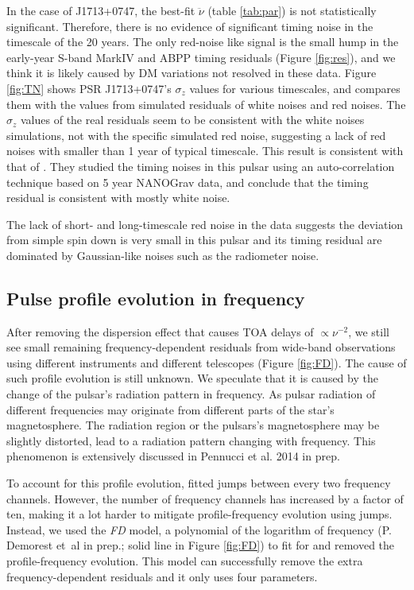 In the case of J1713+0747, the
best-fit $\ddot{\nu}$ (table \ref{tab:par}) is not statistically significant. 
Therefore, there is no evidence of significant timing noise in the
timescale of the 20 years. The only red-noise like
signal is the small hump in the early-year S-band MarkIV and ABPP timing residuals (Figure
\ref{fig:res}), and we think it is likely caused by DM variations not resolved in
these data. Figure \ref{fig:TN} 
shows PSR J1713+0747's $\sigma_z$ values for various timescales, and compares them
with the values from simulated residuals of white noises and
red noises. The $\sigma_z$ values of the real residuals seem to be consistent 
with the white noises simulations, not with the specific simulated red noise,
suggesting a lack of red noises with smaller than 1 year of typical timescale. 
This result is consistent with that of \citet{pjl+13}. They
studied the timing noises in this pulsar using an auto-correlation technique
based on 5 year NANOGrav data, and conclude that the timing residual is
consistent with mostly white noise.

The lack of short- and long-timescale red noise in the data suggests the
deviation from simple spin down is very small in this pulsar and its timing
residual are dominated by Gaussian-like noises such as the radiometer noise.


\subsection{Pulse profile evolution in frequency}
\label{sec:FD}
After removing the dispersion effect that causes TOA delays of $\propto \nu^{-2}$,
 we still see small remaining frequency-dependent residuals from wide-band
observations using
different instruments and different telescopes (Figure \ref{fig:FD}).  
The cause of such profile evolution is still unknown.
We speculate that it is caused by the change of the pulsar's radiation pattern in frequency. As pulsar radiation of different frequencies may originate from
different parts of the star's magnetosphere. 
The radiation region or the pulsars's magnetosphere may be slightly distorted,
lead to a radiation pattern changing with frequency. This phenomenon is extensively discussed in Pennucci et al. 2014 in prep.

To account for this profile evolution, \citet{sns+05} fitted jumps between every two frequency channels. However, the number of frequency channels has increased by a factor of ten, making it a lot harder to mitigate profile-frequency evolution using jumps. 
Instead, we used the {\it FD} model, a polynomial of the logarithm of
frequency (P. Demorest et~al in prep.; solid line in Figure \ref{fig:FD}) to fit for and removed the profile-frequency evolution. This model can successfully remove the extra frequency-dependent residuals and it only uses four parameters.



